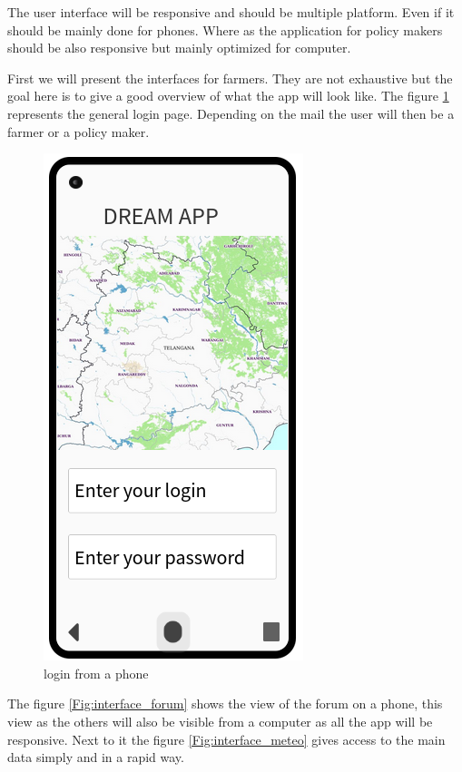 The user interface will be responsive and should be multiple platform. Even if it should be mainly done for phones. \newline
Where as the application for policy makers should be also responsive but mainly optimized for computer.

First we will present the interfaces for farmers. They are not exhaustive but the goal here is to give a good overview of what the app will look like. The figure \ref{Fig:interface_login} represents the general login page. Depending on the mail the user will then be a farmer or a policy maker.

\begin{figure}[H]
	
	\centering
	
	\includegraphics[width=0.3\columnwidth]{Images/login.png}
	
	\caption{login from a phone}
	
	\label{Fig:interface_login}
	
\end{figure}



The figure \ref{Fig:interface_forum} shows the view of the forum on a phone, this view as the others will also be visible from a computer as all the app will be responsive. Next to it the figure \ref{Fig:interface_meteo} gives access to the main data simply and in a rapid way.

